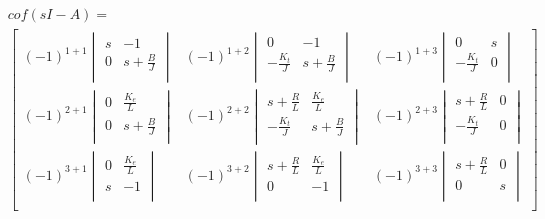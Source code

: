 \begin{equation*}
  \begin{aligned}
    &cof(sI-A) =\\ &\begin{bmatrix}
      (-1)^{1+1}
      \begin{vmatrix}
        s             & -1              \\
        0             &  s+\frac{B}{J}  \\
      \end{vmatrix}&
      (-1)^{1+2}
      \begin{vmatrix}
        0             & -1              \\
       -\frac{K_t}{J} &  s+\frac{B}{J}  \\
      \end{vmatrix}&
      (-1)^{1+3}
      \begin{vmatrix}
        0             & s               \\
       -\frac{K_t}{J} & 0               \\
      \end{vmatrix}\\
      (-1)^{2+1}
      \begin{vmatrix}
        0             &  \frac{K_e}{L} \\
        0             &  s+\frac{B}{J} \\
      \end{vmatrix}&
      (-1)^{2+2}
      \begin{vmatrix}
        s+\frac{R}{L} &  \frac{K_e}{L} \\
       -\frac{K_t}{J} &  s+\frac{B}{J} \\
      \end{vmatrix}&
      (-1)^{2+3}
      \begin{vmatrix}
        s+\frac{R}{L} & 0              \\
       -\frac{K_t}{J} & 0              \\
      \end{vmatrix}\\
      (-1)^{3+1}
      \begin{vmatrix}
        0 &  \frac{K_e}{L}             \\
        s & -1                         \\
      \end{vmatrix}&
      (-1)^{3+2}
      \begin{vmatrix}
        s+\frac{R}{L} &  \frac{K_e}{L} \\
        0             & -1             \\
      \end{vmatrix}&
      (-1)^{3+3}
      \begin{vmatrix}
        s+\frac{R}{L} & 0              \\
        0             & s              \\
      \end{vmatrix}\\
    \end{bmatrix}\\
  \end{aligned}
\end{equation*}


